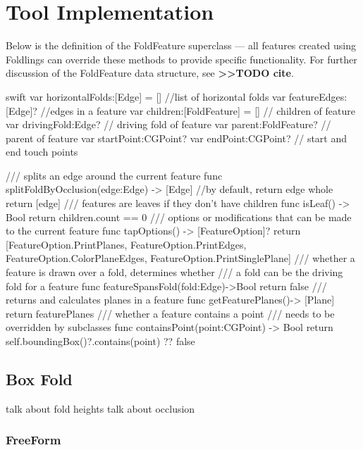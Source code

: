 \section{Tool Implementation}\label{tool-implementation}

Below is the definition of the FoldFeature superclass --- all features
created using Foldlings can override these methods to provide specific
functionality. For further discussion of the FoldFeature data structure,
see \textbf{\textgreater{}\textgreater{}TODO cite}.

\small
\singlespacing 

\begin{pygmented}{swift}
var horizontalFolds:[Edge] = [] //list of horizontal folds
var featureEdges:[Edge]?        //edges in a feature
var children:[FoldFeature] = [] // children of feature
var drivingFold:Edge? // driving fold of feature
var parent:FoldFeature? // parent of feature
var startPoint:CGPoint?
var endPoint:CGPoint? // start and end touch points

/// splits an edge around the current feature
func splitFoldByOcclusion(edge:Edge) -> [Edge]
{
//by default, return edge whole
return [edge]
}
/// features are leaves if they don't have children
func isLeaf() -> Bool
{
return children.count == 0
}
/// options or modifications that can be made to the current feature
func tapOptions() -> [FeatureOption]?
{
  return [FeatureOption.PrintPlanes, FeatureOption.PrintEdges,
  FeatureOption.ColorPlaneEdges, FeatureOption.PrintSinglePlane]
}
/// whether a feature is drawn over a fold, determines whether 
/// a fold can be the driving fold for a feature
  func featureSpansFold(fold:Edge)->Bool
{
  return false
}
/// returns and calculates planes in a feature
func getFeaturePlanes()-> [Plane]{
  return featurePlanes
}
/// whether a feature contains a point
/// needs to be overridden by subclasses
func containsPoint(point:CGPoint) -> Bool{
  return self.boundingBox()?.contains(point) ?? false
}
\end{pygmented}

\doublespacing
\normalsize

\subsection{Box Fold}\label{box-fold}

talk about fold heights talk about occlusion

\subsubsection{FreeForm}\label{freeform}

